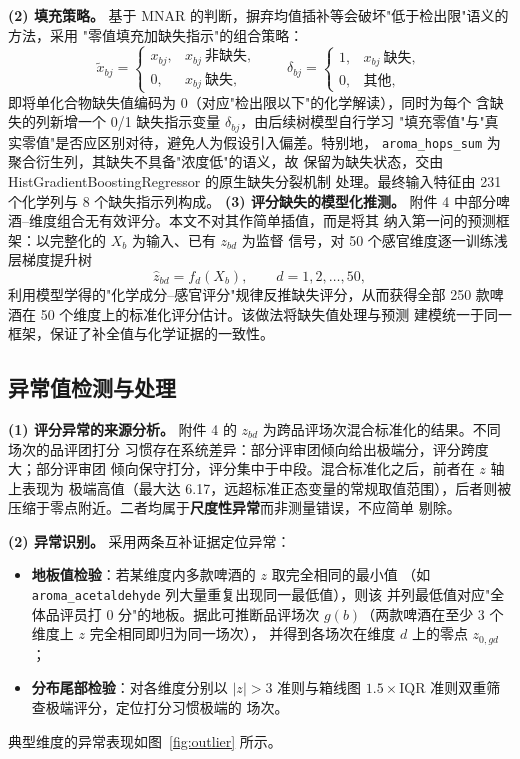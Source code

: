 \documentclass[12pt,a4paper]{article}
\begin{document}
\noindent\textbf{(2) 填充策略。}
基于 MNAR 的判断，摒弃均值插补等会破坏"低于检出限"语义的方法，采用
"零值填充加缺失指示"的组合策略：
\begin{equation}
\tilde x_{bj}=
\left\{
\begin{array}{ll}
x_{bj}, & x_{bj}\ \mbox{非缺失},\\[2pt]
0, & x_{bj}\ \mbox{缺失},
\end{array}
\right.
\qquad
\delta_{bj}=
\left\{
\begin{array}{ll}
1, & x_{bj}\ \mbox{缺失},\\[2pt]
0, & \mbox{其他},
\end{array}
\right.
\end{equation}
即将单化合物缺失值编码为 0（对应"检出限以下"的化学解读），同时为每个
含缺失的列新增一个 0/1 缺失指示变量 $\delta_{bj}$，由后续树模型自行学习
"填充零值"与"真实零值"是否应区别对待，避免人为假设引入偏差。特别地，
\texttt{aroma\_hops\_sum} 为聚合衍生列，其缺失不具备"浓度低"的语义，故
保留为缺失状态，交由 HistGradientBoostingRegressor 的原生缺失分裂机制
处理。最终输入特征由 231 个化学列与 8 个缺失指示列构成。
\noindent\textbf{(3) 评分缺失的模型化推测。}
附件 4 中部分啤酒--维度组合无有效评分。本文不对其作简单插值，而是将其
纳入第一问的预测框架：以完整化的 $X_b$ 为输入、已有 $z_{bd}$ 为监督
信号，对 50 个感官维度逐一训练浅层梯度提升树
\begin{equation}
\hat z_{bd}=f_d(X_b),\qquad d=1,2,\dots,50,
\end{equation}
利用模型学得的"化学成分--感官评分"规律反推缺失评分，从而获得全部
250 款啤酒在 50 个维度上的标准化评分估计。该做法将缺失值处理与预测
建模统一于同一框架，保证了补全值与化学证据的一致性。

\subsection{异常值检测与处理}

\noindent\textbf{(1) 评分异常的来源分析。}
附件 4 的 $z_{bd}$ 为跨品评场次混合标准化的结果。不同场次的品评团打分
习惯存在系统差异：部分评审团倾向给出极端分，评分跨度大；部分评审团
倾向保守打分，评分集中于中段。混合标准化之后，前者在 $z$ 轴上表现为
极端高值（最大达 6.17，远超标准正态变量的常规取值范围），后者则被
压缩于零点附近。二者均属于\textbf{尺度性异常}而非测量错误，不应简单
剔除。

\noindent\textbf{(2) 异常识别。}
采用两条互补证据定位异常：
\begin{itemize}
\item \textbf{地板值检验}：若某维度内多款啤酒的 $z$ 取完全相同的最小值
（如 \texttt{aroma\_acetaldehyde} 列大量重复出现同一最低值），则该
并列最低值对应"全体品评员打 0 分"的地板。据此可推断品评场次
$g(b)$（两款啤酒在至少 3 个维度上 $z$ 完全相同即归为同一场次），
并得到各场次在维度 $d$ 上的零点 $z_{0,gd}$；
\item \textbf{分布尾部检验}：对各维度分别以 $|z|>3$ 准则与箱线图
$1.5\times\mathrm{IQR}$ 准则双重筛查极端评分，定位打分习惯极端的
场次。
\end{itemize}
典型维度的异常表现如图~\ref{fig:outlier} 所示。
\end{document}
